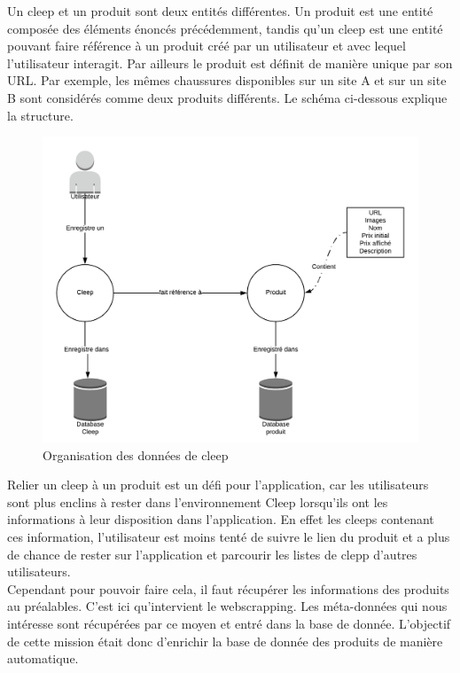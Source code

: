 \documentclass{article} %
\begin{document}
Un cleep et un produit sont deux entités différentes. Un produit est une entité composée des éléments énoncés précédemment, tandis qu'un cleep est une entité pouvant faire référence à un produit créé par un utilisateur et avec lequel l'utilisateur interagit. Par ailleurs le produit est définit de manière unique par son URL. Par exemple, les mêmes chaussures disponibles sur un site A et sur un site B sont considérés comme deux produits différents. Le schéma ci-dessous explique la structure.
\begin{figure}[!h]
	\centering
	\includegraphics[keepaspectratio = true,scale=0.7]{scrapping.png}
	\caption{Organisation des données de cleep}
\end{figure}
\newpage

Relier un cleep à un produit est un défi pour l'application, car les utilisateurs sont plus enclins à rester dans l'environnement Cleep lorsqu'ils ont les informations à leur disposition dans l'application. En effet les cleeps contenant ces information, l'utilisateur est moins tenté de suivre le lien du produit et a plus de chance de rester sur l'application et parcourir les listes de clepp d'autres utilisateurs. \\
Cependant pour pouvoir faire cela, il faut récupérer les informations des produits au préalables. C'est ici qu'intervient le webscrapping. Les méta-données qui nous intéresse sont récupérées par ce moyen et entré dans la base de donnée. L'objectif de cette mission était donc d'enrichir la base de donnée des produits de manière automatique. 
\end{document}
